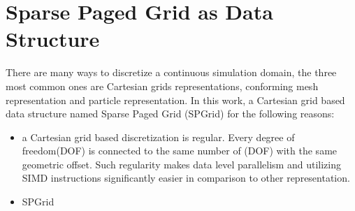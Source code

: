 \section{Sparse Paged Grid as Data Structure} 
There are many ways to discretize a continuous simulation domain, the three most common ones are Cartesian grids representations, conforming mesh representation and particle representation. In this work, a Cartesian grid based data structure named Sparse Paged Grid (SPGrid) for the following reasons:
\begin{itemize}
	\item a Cartesian grid based discretization is regular. Every degree of freedom(DOF) is connected to the same number of (DOF) with the same geometric offset. Such regularity makes data level parallelism and utilizing SIMD instructions significantly easier in comparison to other representation.
	\item SPGrid 

\end{itemize}